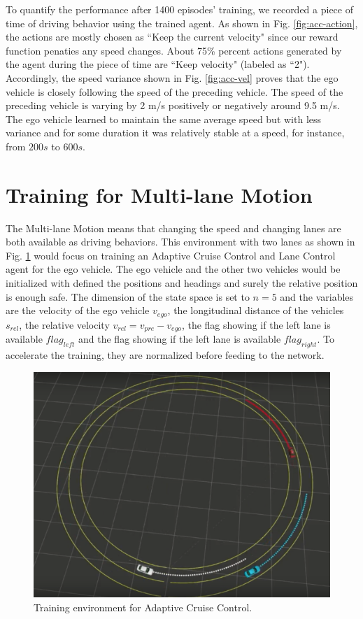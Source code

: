 To quantify the performance after 1400 episodes' training, we recorded a piece of time of driving behavior using the trained agent. As shown in Fig. \ref{fig:acc-action}, the actions are mostly chosen as ``Keep the current velocity" since our reward function penaties any speed changes. About 75\% percent actions generated by the agent during the piece of time are ``Keep velocity" (labeled as ``2"). Accordingly, the speed variance shown in Fig. \ref{fig:acc-vel} proves that the ego vehicle is closely following the speed of the preceding vehicle. The speed of the preceding vehicle is varying by 2 m/s positively or negatively around 9.5 m/s. The ego vehicle learned to maintain the same average speed but with less variance and for some duration it was relatively stable at a speed, for instance, from $200s$ to $600s$.

\section{Training for Multi-lane Motion}

The Multi-lane Motion means that changing the speed and changing lanes are both available as driving behaviors. This environment with two lanes as shown in Fig. \ref{fig:auto-env} would focus on training an Adaptive Cruise Control and Lane Control agent for the ego vehicle. The ego vehicle and the other two vehicles would be initialized with defined the positions and headings and surely the relative position is enough safe. The dimension of the state space is set to $n = 5$ and the variables are the velocity of the ego vehicle $v_{ego}$, the longitudinal distance of the vehicles $s_{rel}$, the relative velocity $v_{rel} = v_{pre} - v_{ego}$, the flag showing if the left lane is available $flag_{left}$ and the flag showing if the left lane is available $flag_{right}$. To accelerate the training, they are normalized before feeding to the network.

\begin{figure}[h]
\centering
\includegraphics[width=1.0\textwidth]{figs/ch5/auto-env}
\caption{Training environment for Adaptive Cruise Control.}
\label{fig:auto-env}
\end{figure}

